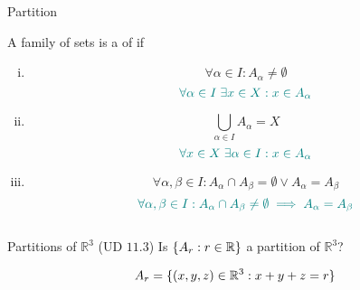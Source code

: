 \begin{frame}{}
  \centerline{\LARGE Partition}

  \vspace{0.60cm}
\end{frame}

\begin{frame}{}
  \begin{definition}[Partition]
    A family of sets  is a  of  if

    \begin{enumerate}[(i)]
      \item 
	\[
	  \forall \alpha \in I: A_{\alpha} \neq \emptyset
	\]
	\[
	  \textcolor{teal}{\forall \alpha \in I \; \exists x \in X: x \in A_{\alpha}}
	\]
      \item 
	\[
	  \bigcup_{\alpha \in I} A_{\alpha} = X
	\]
	\[
	  \textcolor{teal}{\forall x \in X \; \exists \alpha \in I: x \in A_{\alpha}}
	\]
      \item 
	\[
	  \forall \alpha, \beta \in I: A_{\alpha} \cap A_{\beta} = \emptyset \lor A_{\alpha} = A_{\beta}
	\]
	\[
	  \textcolor{teal}{\forall \alpha, \beta \in I: A_{\alpha} \cap A_{\beta} \neq \emptyset \implies A_{\alpha} = A_{\beta}}
	\]
    \end{enumerate}
  \end{definition}
\end{frame}

\begin{frame}{}
  \begin{columns}
  \end{columns}
\end{frame}

\begin{frame}{}
  \begin{exampleblock}{Partitions of $\mathbb{R}^{3}$ (UD $11.3$)}
    Is $\{A_r: r \in \mathbb{R}\}$ a partition of $\mathbb{R}^{3}$?

    \[
      A_{r} = \{(x,y,z) \in \mathbb{R}^{3}: x + y + z = r\}
    \]
  \end{exampleblock}

  \pause
\end{frame}

